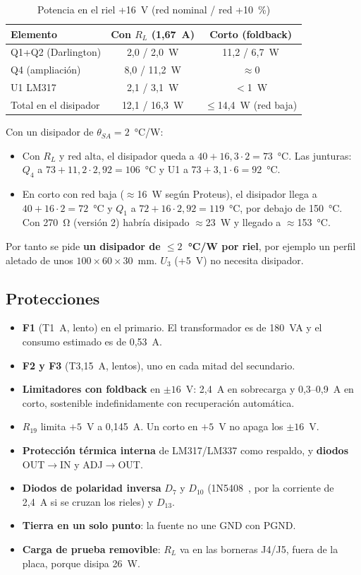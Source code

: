 \documentclass[conference]{IEEEtran}
\begin{document}
\begin{table}[htbp]
\caption{Potencia en el riel +16~V (red nominal / red +10~\%)}
\label{tab:pot}
\centering
\footnotesize
\begin{tabular}{@{}lcc@{}}
\toprule
Elemento & Con $R_L$ (1,67~A) & Corto (foldback) \\
\midrule
Q1+Q2 (Darlington) & 2,0 / 2,0~W & 11,2 / 6,7~W \\
Q4 (ampliación) & 8,0 / 11,2~W & $\approx$0 \\
U1 LM317 & 2,1 / 3,1~W & $<$1~W \\
Total en el disipador & 12,1 / 16,3~W & $\leq$14,4~W (red baja) \\
\bottomrule
\end{tabular}
\end{table}

Con un disipador de $\theta_{SA}=2$~°C/W:
\begin{itemize}
\item Con $R_L$ y red alta, el disipador queda a $40+16{,}3\cdot2=73$~°C. Las junturas: $Q_4$ a $73+11{,}2\cdot2{,}92=106$~°C y U1 a $73+3{,}1\cdot6=92$~°C.
\item En corto con red baja ($\approx$16~W según Proteus), el disipador llega a $40+16\cdot2=72$~°C y $Q_1$ a $72+16\cdot2{,}92=119$~°C, por debajo de 150~°C. Con \SI{270}{\ohm} (versión 2) habría disipado $\approx$23~W y llegado a $\approx$153~°C.
\end{itemize}
Por tanto se pide \textbf{un disipador de $\leq2$~°C/W por riel}, por ejemplo un perfil aletado de unos $100\times60\times30$~mm. $U_3$ (+5~V) no necesita disipador.

\subsection{Protecciones}
\begin{itemize}
\item \textbf{F1} (T1~A, lento) en el primario. El transformador es de 180~VA y el consumo estimado es de 0,53~A.
\item \textbf{F2 y F3} (T3,15~A, lentos), uno en cada mitad del secundario.
\item \textbf{Limitadores con foldback} en $\pm16$~V: 2,4~A en sobrecarga y 0,3--0,9~A en corto, sostenible indefinidamente con recuperación automática.
\item \textbf{$R_{19}$} limita $+5$~V a 0,145~A. Un corto en $+5$~V no apaga los $\pm16$~V.
\item \textbf{Protección térmica interna} de LM317/LM337 como respaldo, y \textbf{diodos} OUT$\rightarrow$IN y ADJ$\rightarrow$OUT.
\item \textbf{Diodos de polaridad inversa} $D_7$ y $D_{10}$ (1N5408~\cite{d1n5408}, por la corriente de 2,4~A si se cruzan los rieles) y $D_{13}$.
\item \textbf{Tierra en un solo punto}: la fuente no une GND con PGND.
\item \textbf{Carga de prueba removible}: $R_L$ va en las borneras J4/J5, fuera de la placa, porque disipa 26~W.
\end{itemize}
\end{document}
